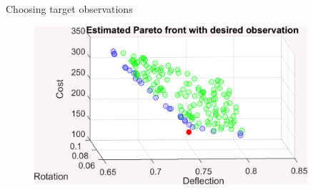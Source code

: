 \documentclass[final]{beamer}
\newlength{\sepwid}
\newlength{\onecolwid}
\newlength{\twocolwid}
\begin{document}
\begin{frame}[t]
\begin{columns}[t]
\begin{column}{\onecolwid}
\begin{alertblock}{Choosing target observations}
\begin{figure}[h!]
\includegraphics[width=.875\linewidth]{FIG_est_PF_with_des_obs}
\label{est_PF}
\end{figure}


\end{alertblock}





%
%
%
%


\end{column} %



\begin{column}{\sepwid}\end{column} %

\begin{column}{\twocolwid} %


\end{column}
\end{columns}
\end{frame}
\end{document}
